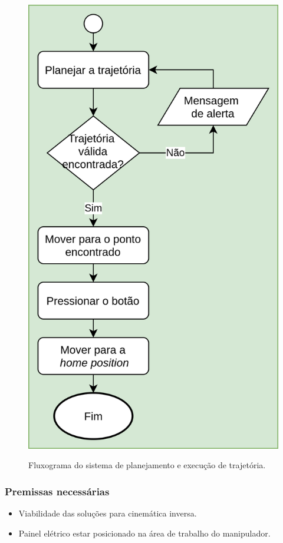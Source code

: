 \begin{figure}[H]
  \caption{Fluxograma do sistema de planejamento e execução de trajetória.}
  \centering
  \includegraphics[scale=0.15]{images/fluxograma_plan_traj.png}
  \label{fig:flux_pos}
\end{figure}
  

\subsubsection{Premissas necessárias}
\label{ssub:premB}
\begin{itemize}
    \item Viabilidade das soluções para cinemática inversa.
    \item Painel elétrico estar posicionado na área de trabalho do manipulador.
\end{itemize}

